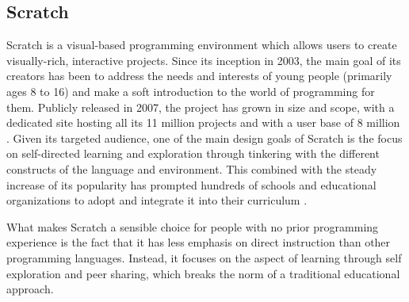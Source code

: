 \subsection{Scratch}
Scratch is a visual-based programming environment which allows users to create visually-rich, interactive projects.  Since its inception in 2003, the main goal of its creators has been to address the needs and interests of young people (primarily ages 8 to 16) and make a soft introduction to the world of programming for them. Publicly released in 2007, the project has grown in size and scope, with a dedicated site hosting all its 11 million projects and with a user base of 8 million \cite{scratchstat}.
Given its targeted audience, one of the main design goals of Scratch is the focus on self-directed learning and exploration through tinkering with the different constructs of the language and environment. This combined with the steady increase of its popularity has prompted hundreds of schools and educational organizations to adopt and integrate it into their curriculum \cite{MaloneyResnick10}.

What makes Scratch a sensible choice for people with no prior programming experience is the fact that it has less emphasis on direct instruction than other programming languages. Instead, it focuses on the aspect of learning through self exploration and peer sharing, which breaks the norm of a traditional educational approach.



